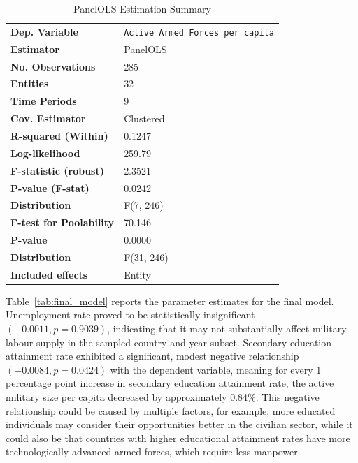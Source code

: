 \begin{table}[htbp]
\caption{PanelOLS Estimation Summary}
\centering
\begin{threeparttable}
\label{tab:panelols_summary}
\begin{tabularx}{\textwidth}{@{}lX@{}}
\toprule
\textbf{Dep. Variable} & \texttt{Active Armed Forces per capita} \\
\textbf{Estimator} & PanelOLS \\
\textbf{No. Observations} & 285 \\
\textbf{Entities} & 32 \\
\textbf{Time Periods} & 9 \\
\textbf{Cov. Estimator} & Clustered \\
\midrule
\textbf{R-squared (Within)} & 0.1247 \\
\textbf{Log-likelihood} & 259.79 \\
\textbf{F-statistic (robust)} & 2.3521 \\
\textbf{P-value (F-stat)} & 0.0242 \\
\textbf{Distribution} & F(7, 246) \\
\midrule
\textbf{F-test for Poolability} & 70.146 \\
\textbf{P-value} & 0.0000 \\
\textbf{Distribution} & F(31, 246) \\
\textbf{Included effects} & Entity \\
\bottomrule
\end{tabularx}
\end{threeparttable}
\label{tab:model_summary}
\end{table}

Table~\ref{tab:final_model} reports the parameter estimates for the final model. 
Unemployment rate proved to be statistically insignificant $(-0.0011, p=0.9039)$, 
indicating that it may not substantially affect military labour supply in the sampled country and year subset.
Secondary education attainment rate exhibited a significant, modest negative relationship $(-0.0084, p=0.0424)$ 
with the dependent variable, meaning for every 1 percentage point increase in secondary education 
attainment rate, the active military size per capita decreased by approximately 0.84\%.
This negative relationship could be caused by multiple factors, for example, more educated individuals 
may consider their opportunities better in the civilian sector, while it could also be that countries 
with higher educational attainment rates have more technologically advanced armed forces, which require 
less manpower.


